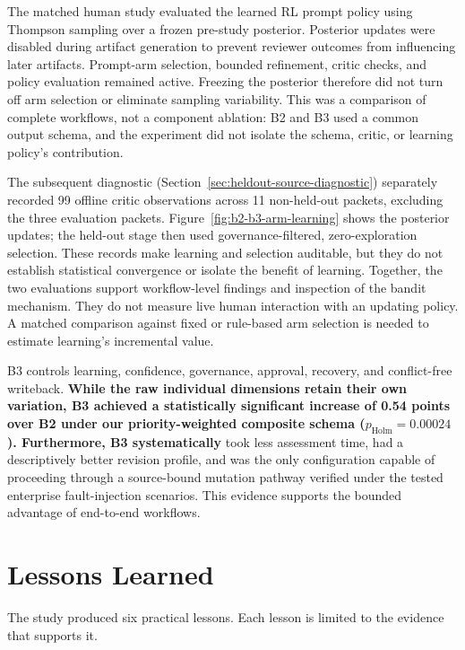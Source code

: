 \documentclass[pdflatex,sn-basic]{sn-jnl}
\begin{document}
The matched human study evaluated the learned RL prompt policy using Thompson sampling over a frozen pre-study posterior. Posterior updates were disabled during artifact generation to prevent reviewer outcomes from influencing later artifacts. Prompt-arm selection, bounded refinement, critic checks, and policy evaluation remained active. Freezing the posterior therefore did not turn off arm selection or eliminate sampling variability. This was a comparison of complete workflows, not a component ablation: B2 and B3 used a common output schema, and the experiment did not isolate the schema, critic, or learning policy's contribution.

The subsequent diagnostic (Section~\ref{sec:heldout-source-diagnostic}) separately recorded 99 offline critic observations across 11 non-held-out packets, excluding the three evaluation packets. Figure~\ref{fig:b2-b3-arm-learning} shows the posterior updates; the held-out stage then used governance-filtered, zero-exploration selection. These records make learning and selection auditable, but they do not establish statistical convergence or isolate the benefit of learning. Together, the two evaluations support workflow-level findings and inspection of the bandit mechanism. They do not measure live human interaction with an updating policy. A matched comparison against fixed or rule-based arm selection is needed to estimate learning's incremental value.

B3 controls learning, confidence, governance, approval, recovery, and conflict-free writeback. \textbf{While the raw individual dimensions retain their own variation, B3 achieved a statistically significant increase of 0.54 points over B2 under our priority-weighted composite schema ($p_{\mathrm{Holm}}=0.00024$). Furthermore, B3 systematically} took less assessment time, had a descriptively better revision profile, and was the only configuration capable of proceeding through a source-bound mutation pathway verified under the tested enterprise fault-injection scenarios. This evidence supports the bounded advantage of end-to-end workflows.

\section{Lessons Learned}\label{sec:lessons}

The study produced six practical lessons. Each lesson is limited to the evidence that supports it.
\end{document}
